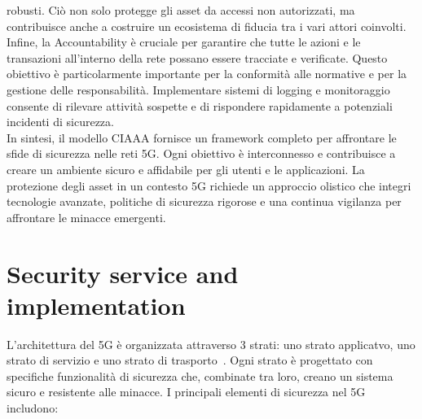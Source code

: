 \documentclass[english]{article}
\begin{document}
robusti. Ciò non solo protegge gli asset da accessi non autorizzati, ma
contribuisce anche a costruire un ecosistema di fiducia tra i vari attori
coinvolti. \\ Infine, la Accountability è cruciale per garantire che tutte le
azioni e le transazioni all'interno della rete possano essere tracciate e
verificate. Questo obiettivo è particolarmente importante per la conformità
alle normative e per la gestione delle responsabilità. Implementare sistemi di
logging e monitoraggio consente di rilevare attività sospette e di rispondere
rapidamente a potenziali incidenti di sicurezza. \\ In sintesi, il modello
CIAAA fornisce un framework completo per affrontare le sfide di sicurezza nelle
reti 5G. Ogni obiettivo è interconnesso e contribuisce a creare un ambiente
sicuro e affidabile per gli utenti e le applicazioni. La protezione degli asset
in un contesto 5G richiede un approccio olistico che integri tecnologie
avanzate, politiche di sicurezza rigorose e una continua vigilanza per
affrontare le minacce emergenti.
\section{Security service and implementation}\label{sec:4}
L'architettura del 5G è organizzata attraverso 3 strati: uno strato applicatvo,
uno strato di servizio e uno strato di trasporto~\cite{Jover2018Security}. Ogni
strato è progettato con specifiche funzionalità di sicurezza che, combinate tra
loro, creano un sistema sicuro e resistente alle minacce. I principali elementi
di sicurezza nel 5G includono:
\end{document}
